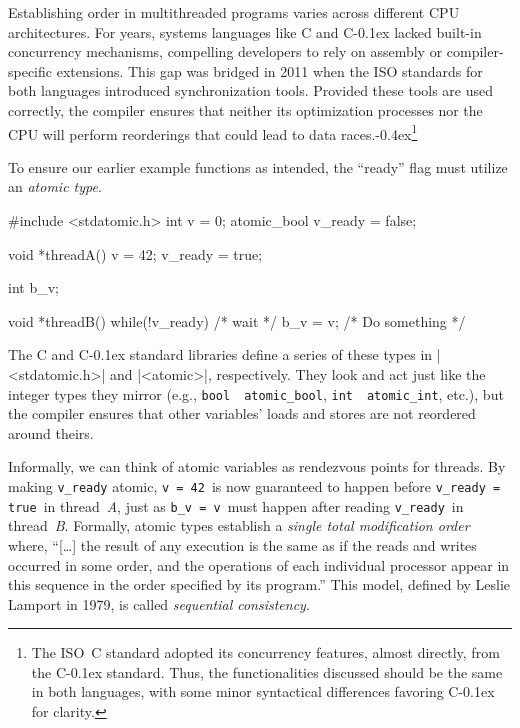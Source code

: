 \documentclass[fontsize=10pt, oneside]{scrartcl}
\newcommand{\punckern}{\kern-0.4ex}
\newcommand{\monobox}[1]{\mbox{\texttt{#1}}}
\newcommand{\cplusplus}[1]{C\kern-0.1ex\raisebox{0.15ex}{\texttt{++}}}
\newcommand{\clang}[1]{C}
\newcommand{\introduce}[1]{\textit{#1}}
\begin{document}
Establishing order in multithreaded programs varies across different \textsc{CPU} architectures.
For years, systems languages like \clang{} and \cplusplus{} lacked built-in concurrency mechanisms,
compelling developers to rely on assembly or compiler-specific extensions.
This gap was bridged in 2011 when the \textsc{ISO} standards for both languages introduced synchronization tools.
Provided these tools are used correctly,
the compiler ensures that neither its optimization processes nor the \textsc{CPU} will perform reorderings that could lead to data races.\punckern\footnote{%
The ISO~\clang{11} standard adopted its concurrency features,
almost directly, from the \cplusplus{11} standard.
Thus, the functionalities discussed should be the same in both languages,
with some minor syntactical differences favoring \cplusplus{} for clarity.
}

To ensure our earlier example functions as intended,
the ``ready'' flag must utilize an \introduce{atomic type}.
\begin{ccode}
#include <stdatomic.h>
int v = 0;
atomic_bool v_ready = false;

void *threadA()
{
    v = 42;
    v_ready = true;
}
\end{ccode}
\begin{ccode}
int b_v;

void *threadB()
{
    while(!v_ready) { /* wait */ }
    b_v = v;
    /* Do something */
}
\end{ccode}
The \clang{} and \cplusplus{} standard libraries define a series of these types in \cc|<stdatomic.h>| and \cpp|<atomic>|,
respectively.
They look and act just like the integer types they mirror (e.g., \monobox{bool}~\textrightarrow~\monobox{atomic\_bool},
\monobox{int}~\textrightarrow~\monobox{atomic\_int}, etc.),
but the compiler ensures that other variables' loads and stores are not reordered around theirs.

Informally, we can think of atomic variables as rendezvous points for threads.
By making \monobox{v\_ready} atomic,
\monobox{v = 42}\, is now guaranteed to happen before \monobox{v\_ready = true}\, in thread~\textit{A},
just as \monobox{b\_v = v}\, must happen after reading \monobox{v\_ready}\,
in thread~\textit{B}.
Formally, atomic types establish a \textit{single total modification order} where,
``[\ldots] the result of any execution is the same as if the reads and writes occurred in some order, and the operations of each individual processor appear in this sequence in the order specified by its program.''
This model, defined by Leslie Lamport in 1979,
is called \introduce{sequential consistency}.
\end{document}
